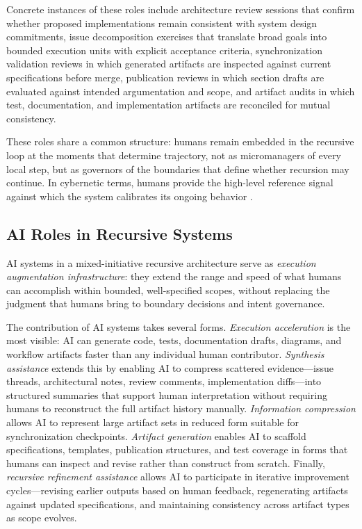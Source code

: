 Concrete instances of these roles include architecture review sessions that confirm whether proposed implementations remain consistent with system design commitments, issue decomposition exercises that translate broad goals into bounded execution units with explicit acceptance criteria, synchronization validation reviews in which generated artifacts are inspected against current specifications before merge, publication reviews in which section drafts are evaluated against intended argumentation and scope, and artifact audits in which test, documentation, and implementation artifacts are reconciled for mutual consistency.

These roles share a common structure: humans remain embedded in the recursive loop at the moments that determine trajectory, not as micromanagers of every local step, but as governors of the boundaries that define whether recursion may continue. In cybernetic terms, humans provide the high-level reference signal against which the system calibrates its ongoing behavior \cite{Wiener1948Cybernetics,Beer1972BrainFirm}.

\subsection{AI Roles in Recursive Systems}

AI systems in a mixed-initiative recursive architecture serve as \textit{execution augmentation infrastructure}: they extend the range and speed of what humans can accomplish within bounded, well-specified scopes, without replacing the judgment that humans bring to boundary decisions and intent governance.

The contribution of AI systems takes several forms. \textit{Execution acceleration} is the most visible: AI can generate code, tests, documentation drafts, diagrams, and workflow artifacts faster than any individual human contributor. \textit{Synthesis assistance} extends this by enabling AI to compress scattered evidence---issue threads, architectural notes, review comments, implementation diffs---into structured summaries that support human interpretation without requiring humans to reconstruct the full artifact history manually. \textit{Information compression} allows AI to represent large artifact sets in reduced form suitable for synchronization checkpoints. \textit{Artifact generation} enables AI to scaffold specifications, templates, publication structures, and test coverage in forms that humans can inspect and revise rather than construct from scratch. Finally, \textit{recursive refinement assistance} allows AI to participate in iterative improvement cycles---revising earlier outputs based on human feedback, regenerating artifacts against updated specifications, and maintaining consistency across artifact types as scope evolves.

